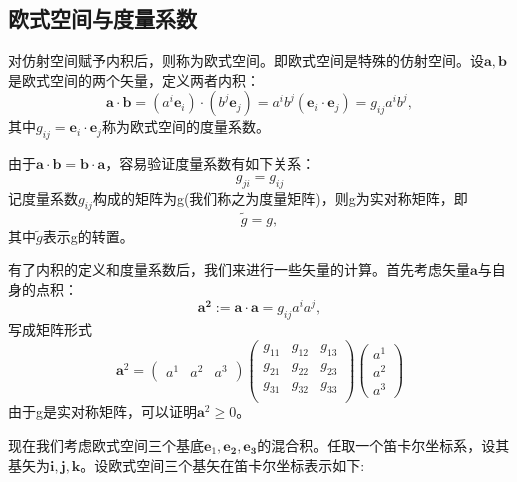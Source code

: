 \subsection{欧式空间与度量系数}
对仿射空间赋予内积后，则称为欧式空间。即欧式空间是特殊的仿射空间。设$\boldsymbol{a},\boldsymbol{b}$是欧式空间的两个矢量，定义两者内积：
\begin{equation}
    \boldsymbol{a}\cdot \boldsymbol{b} = (a^i \boldsymbol{e}_i)\cdot (b^j \boldsymbol{e}_j) = 
    a^ib^j (\boldsymbol{e}_i \cdot \boldsymbol{e}_j) = g_{ij}a^ib^j,
\end{equation}
其中$g_{ij} = \boldsymbol{e}_i \cdot \boldsymbol{e}_j$称为欧式空间的度量系数。
\par 由于$\boldsymbol{a}\cdot \boldsymbol{b}  = \boldsymbol{b}\cdot \boldsymbol{a}$，容易验证度量系数有如下关系：
\begin{equation}
    g_{ji} = g_{ij}
\end{equation}
记度量系数$g_{ij}$构成的矩阵为g(我们称之为度量矩阵)，则g为实对称矩阵，即
\begin{equation}
    \tilde{g} = g,
\end{equation}
其中$\tilde{g}$表示g的转置。
\par 有了内积的定义和度量系数后，我们来进行一些矢量的计算。首先考虑矢量$\boldsymbol{a}$与自身的点积：
\begin{equation}
    \boldsymbol{a^2} :=\boldsymbol{a}\cdot \boldsymbol{a} = g_{ij}a^i a^j,
\end{equation}
写成矩阵形式
\begin{equation}
    \boldsymbol{a}^2 = \left( 
    \begin{array}{ccc}
        a^1 & a^2 & a^3
    \end{array}\right)
    \left(\begin{array}{ccc}
         g_{11}&g_{12} &g_{13} \\
         g_{21}&g_{22} &g_{23} \\
         g_{31}&g_{32} &g_{33} \\
    \end{array}\right)
    \left(
    \begin{array}{c}
         a^1  \\
         a^2 \\
         a^3
    \end{array}\right)
\end{equation}
由于g是实对称矩阵，可以证明$\boldsymbol{a}^2 \ge 0$。
\par 现在我们考虑欧式空间三个基底$\boldsymbol{e}_1 ,\boldsymbol{e_2},\boldsymbol{e_3}$的混合积。任取一个笛卡尔坐标系，设其基矢为$\boldsymbol{i},\boldsymbol{j},\boldsymbol{k}$。设欧式空间三个基矢在笛卡尔坐标表示如下:
